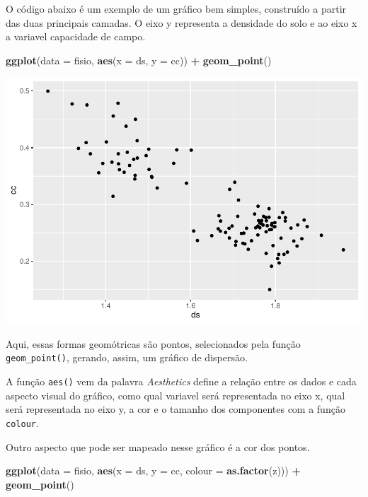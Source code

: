\documentclass[]{book}
\newenvironment{Shaded}{\begin{snugshade}}{\end{snugshade}}
\newcommand{\DataTypeTok}[1]{\textcolor[rgb]{0.13,0.29,0.53}{#1}}
\newcommand{\KeywordTok}[1]{\textcolor[rgb]{0.13,0.29,0.53}{\textbf{#1}}}
\newcommand{\NormalTok}[1]{#1}
\newcommand{\OperatorTok}[1]{\textcolor[rgb]{0.81,0.36,0.00}{\textbf{#1}}}
\newcommand{\StringTok}[1]{\textcolor[rgb]{0.31,0.60,0.02}{#1}}
\begin{document}
O código abaixo é um exemplo de um gráfico bem simples, construído a partir das duas principais camadas. O eixo y representa a densidade do solo e ao eixo x a variavel capacidade de campo.

\begin{Shaded}
\begin{Highlighting}[]
\KeywordTok{ggplot}\NormalTok{(}\DataTypeTok{data =}\NormalTok{ fisio, }\KeywordTok{aes}\NormalTok{(}\DataTypeTok{x =}\NormalTok{ ds, }\DataTypeTok{y =}\NormalTok{ cc)) }\OperatorTok{+}
\StringTok{  }\KeywordTok{geom_point}\NormalTok{()}
\end{Highlighting}
\end{Shaded}

\includegraphics{TudodoR_files/figure-latex/unnamed-chunk-186-1.pdf}

Aqui, essas formas geomótricas são pontos, selecionados pela função \texttt{geom\_point()}, gerando, assim, um gráfico de dispersão.

A função \texttt{aes()} vem da palavra \emph{Aesthetics} define a relação entre os dados e cada aspecto visual do gráfico, como qual variavel será representada no eixo x, qual será representada no eixo y, a cor e o tamanho dos componentes com a função \texttt{colour}.

Outro aspecto que pode ser mapeado nesse gráfico é a cor dos pontos.

\begin{Shaded}
\begin{Highlighting}[]
\KeywordTok{ggplot}\NormalTok{(}\DataTypeTok{data =}\NormalTok{ fisio, }\KeywordTok{aes}\NormalTok{(}\DataTypeTok{x =}\NormalTok{ ds, }\DataTypeTok{y =}\NormalTok{ cc, }\DataTypeTok{colour =} \KeywordTok{as.factor}\NormalTok{(z))) }\OperatorTok{+}
\StringTok{  }\KeywordTok{geom_point}\NormalTok{()}
\end{Highlighting}
\end{Shaded}
\end{document}
